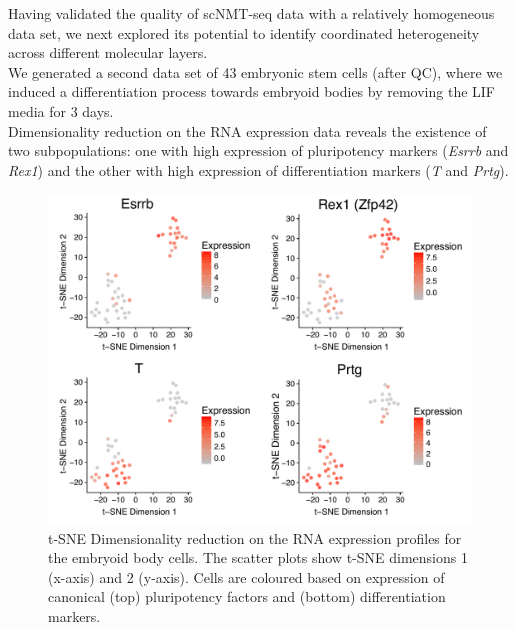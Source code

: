 Having validated the quality of scNMT-seq data with a relatively homogeneous data set, we next explored its potential to identify coordinated heterogeneity across different molecular layers.\\
We generated a second data set of 43 embryonic stem cells (after QC), where we induced a differentiation process towards embryoid bodies by removing the LIF media for 3 days.\\Dimensionality reduction on the RNA expression data reveals the existence of two subpopulations: one with high expression of pluripotency markers (\textit{Esrrb} and \textit{Rex1}) and the other with high expression of differentiation markers (\textit{T} and \textit{Prtg}).




\begin{figure}[H]
	\centering
	\includegraphics[width=0.8\linewidth]{scNMT_EB_RNA}
	\caption[]{t-SNE Dimensionality reduction on the RNA expression profiles for the embryoid body cells. The scatter plots show t-SNE dimensions 1 (x-axis) and 2 (y-axis). Cells are coloured based on expression of canonical (top) pluripotency factors and (bottom) differentiation markers.  }
	\label{fig:scnmt_eb_rna}
\end{figure}

